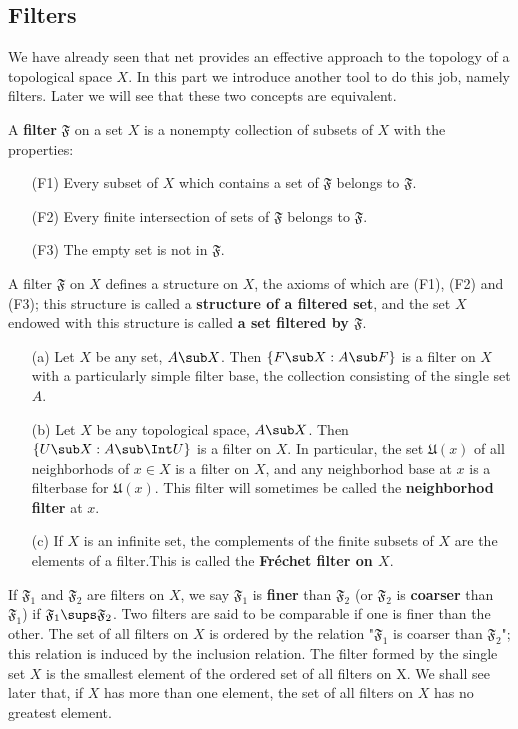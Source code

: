 \subsection{Filters}
We have already seen that net provides an effective approach to the topology of a topological space $X$. In this part we introduce another tool to do this job, namely filters. Later we will see that these two concepts are equivalent.
\begin{definition}
A \textbf{filter} $\mathfrak{F}$ on a set $X$ is a nonempty collection of subsets of $X$ with the properties:
\begin{itemize}
\item[(F1)] Every subset of $X$ which contains a set of $\mathfrak{F}$ belongs to $\mathfrak{F}$.
\item[(F2)] Every finite intersection of sets of $\mathfrak{F}$ belongs to $\mathfrak{F}$.
\item[(F3)] The empty set is not in $\mathfrak{F}$.
\end{itemize}
\end{definition}
A filter $\mathfrak{F}$ on $X$ defines a structure on $X$, the axioms of which are (F1), (F2) and (F3); this structure is called a \textbf{structure of a filtered set}, and the set $X$ endowed with this structure is called \textbf{a set filtered by $\mathfrak{F}$}.
\begin{example}
\mbox{}
\begin{itemize}
\item[(a)] Let $X$ be any set, $A\sub X$. Then $\{F\sub X:A\sub F\}$ is a filter on $X$ with a particularly simple filter base, the collection consisting of the single set $A$.
\item[(b)] Let $X$ be any topological space, $A\sub X$. Then $\{U\sub X:A\sub\Int U\}$ is a filter on $X$. In particular, the set $\mathfrak{U}(x)$ of all neighborhods of $x\in X$ is a filter on $X$, and any neighborhod base at $x$ is a filterbase for $\mathfrak{U}(x)$. This filter will sometimes be called the \textbf{neighborhod filter} at $x$.
\item[(c)] If $X$ is an infinite set, the complements of the finite subsets of $X$ are the elements of a filter.This is called the \textbf{Fr\'echet filter on $X$}.
\end{itemize}
\end{example}
If $\mathfrak{F}_1$ and $\mathfrak{F}_2$ are filters on $X$, we say $\mathfrak{F}_1$ is \textbf{finer} than $\mathfrak{F}_2$ (or $\mathfrak{F}_2$ is \textbf{coarser} than $\mathfrak{F}_1$) if $\mathfrak{F}_1\sups\mathfrak{F}_2$. Two filters are said to be comparable if one is finer than the other. The set of all filters on $X$ is ordered by the relation "$\mathfrak{F}_1$ is coarser than $\mathfrak{F}_2$"; this relation is induced by the inclusion relation. The filter formed by the single set $X$ is the smallest element of the ordered set of all filters on X. We shall see later that, if $X$ has more than one element, the set of all filters on $X$ has no greatest element.\par
